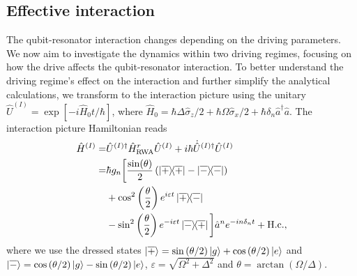 \subsection{Effective interaction\label{sec:EffectiveInt}}
The qubit-resonator interaction changes depending on the driving parameters. We now aim to investigate the dynamics within two driving regimes, focusing on how the drive affects the qubit-resonator interaction. To better understand the driving regime's effect on the interaction and further simplify the analytical calculations, we transform to the interaction picture using the unitary $\hat{U}^{(I)}=\exp[-i \hat{H}_0 t/\hbar]$, where $\hat{H}_0=\hbar\Delta \hat{\sigma}_z/2 + \hbar\Omega\hat{\sigma}_x/2 + \hbar \delta_n \hat{a}^\dagger \hat{a}$. The interaction picture Hamiltonian reads
\begin{align}\label{eq:IntPicHam}
     \hat{H}^{(I)} =& \hat{U}^{(I) \dagger} \hat{H}^r_{\text{RWA}}\hat{U}^{(I)}+i\hbar \dot{\hat{U}}^{(I) \dagger}\hat{U}^{(I)}\nonumber\\ =&\hbar g_n\bigg[ \frac{\sin(\theta)}{2}\left( \dyad{\overline{+}}-\dyad{\overline{-}}\right) \nonumber\\&+\cos^2\left(\frac{\theta}{2}\right)e^{i\varepsilon t}\dyad{\overline{+}}{\overline{-}}\nonumber\\ &-\sin^2\left(\frac{\theta}{2}\right)e^{-i\varepsilon t}\dyad{\overline{-}}{\overline{+}}\bigg] \hat{a}^n e^{-in\delta_n t} + \text{H.c.},
\end{align}
where we use the dressed states $\ket{\overline{+}}=\sin\left(\theta /2\right)\ket{{g}}+\cos\left(\theta /2\right)\ket{{e}}$ and $\ket{\overline{-}}=\cos\left(\theta /2\right)\ket{{g}}-\sin\left(\theta /2\right)\ket{{e}}$, $\varepsilon=\sqrt{\Omega^2 +\Delta^2}$ and $\theta=\arctan(\Omega/\Delta)$.

